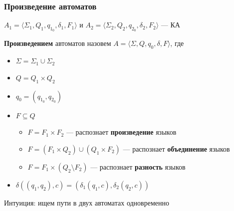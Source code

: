 \documentclass{beamer}
\begin{document}
\begin{frame}[fragile]
\begin{center}
{
    }
  \end{center}

\end{frame}

\begin{frame}[fragile]
  \transwipe[direction=90]
  \frametitle{Произведение автоматов}
   $A_1 = \langle \Sigma_1, Q_1, q_{1_0}, \delta_1, F_1 \rangle$ и $A_2 = \langle \Sigma_2, Q_2, q_{2_0}, \delta_2, F_2 \rangle$ --- КА
  
   \vfill 

  \textbf{Произведением} автоматов назовем $A = \langle \Sigma, Q, q_0, \delta, F \rangle$, где

  \vfill

  \begin{itemize}
    \item $\Sigma = \Sigma_1 \cup \Sigma_2$
    \item $Q = Q_1 \times Q_2$
    \item $q_0 = (q_{1_0}, q_{2_0})$
    \item $F \subseteq Q$
    \begin{itemize}
      \item $F = F_1 \times F_2$ --- распознает \textbf{произведение} языков
      \item $F = (F_1 \times Q_2) \cup (Q_1 \times F_2)$ --- распознает \textbf{объединение} языков
      \item $F = F_1 \times (Q_2 \setminus F_2)$ --- распознает \textbf{разность} языков
    \end{itemize}
    \item $\delta((q_1, q_2), c) = (\delta_1(q_1, c), \delta_2(q_2, c))$
  \end{itemize}
  
  \vfill 

  Интуиция: ищем пути в двух автоматах одновременно
\end{frame}
\end{document}
